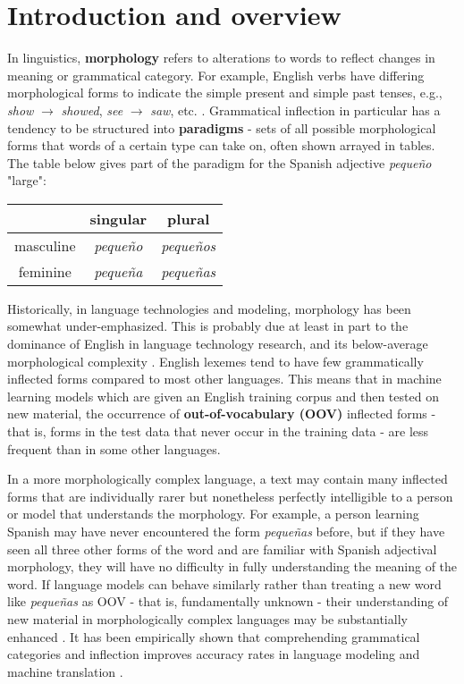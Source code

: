 \chapter{Introduction and overview}
\label{introduction}

In linguistics, \textbf{morphology} refers to alterations to words to reflect changes in meaning or grammatical category. For example, English verbs have differing morphological forms to indicate the simple present and simple past tenses, e.g., \textit{show} $\rightarrow$ \textit{showed}, \textit{see} $\rightarrow$ \textit{saw}, etc. \parencite{Dreyer2008}. Grammatical inflection in particular has a tendency to be structured into \textbf{paradigms} - sets of all possible morphological forms that words of a certain type can take on, often shown arrayed in tables. The table below gives part of the paradigm for the Spanish adjective \textit{pequeño} "large":

\begin{center}
\begin{tabular}{|c||c|c|}
\hline
& singular & plural \\
\hline \hline
masculine & \textit{pequeño} & \textit{pequeños} \\
\hline 
feminine & \textit{pequeña} & \textit{pequeñas} \\
\hline
\end{tabular}
\end{center}

Historically, in language technologies and modeling, morphology has been somewhat under-emphasized. This is probably due at least in part to the dominance of English in language technology research, and its below-average morphological complexity \parencite{Cotterell2017a}. English lexemes tend to have few grammatically inflected forms compared to most other languages. This means that in machine learning models which are given an English training corpus and then tested on new material, the occurrence of \textbf{out-of-vocabulary (OOV)} inflected forms - that is, forms in the test data that never occur in the training data - are less frequent than in some other languages. 

In a more morphologically complex language, a text may contain many inflected forms that are individually rarer but nonetheless perfectly intelligible to a person or model that understands the morphology. For example, a person learning Spanish may have never encountered the form \textit{pequeñas} before, but if they have seen all three other forms of the word and are familiar with Spanish adjectival morphology, they will have no difficulty in fully understanding the meaning of the word. If language models can behave similarly rather than treating a new word like \textit{pequeñas} as OOV - that is, fundamentally unknown - their understanding of new material in morphologically complex languages may be substantially enhanced \parencite{Cotterell2016}. It has been empirically shown that comprehending grammatical categories and inflection improves accuracy rates in language modeling and machine translation \parencite{Faruqui2015}.

